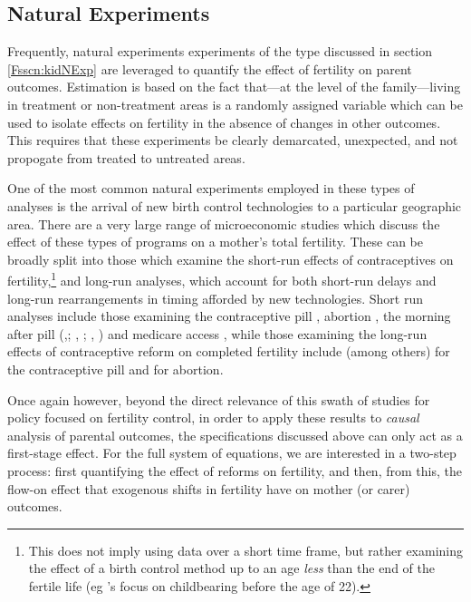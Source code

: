 \documentclass{article}
\begin{document}
\begin{spacing}{1.4}
\subsection{Natural Experiments}
\label{Fsscn:motherNExp}
Frequently, natural experiments experiments of the type discussed in section 
\ref{Fsscn:kidNExp} are leveraged to quantify the effect of fertility on 
parent outcomes.  Estimation is based on the fact that---at the level of the
family---living in treatment or non-treatment areas is a randomly assigned
variable which can be used to isolate effects on fertility in the absence of 
changes in other outcomes.  This requires that these experiments be clearly 
demarcated, unexpected, and not propogate from treated to untreated areas.

One of the most common natural experiments employed in these types of analyses 
is the arrival of new birth control technologies to a particular geographic 
area.  There are a very large range of microeconomic studies which discuss 
the effect of these types of programs on a mother's total fertility.  These can
be broadly split into those which examine the short-run effects of 
contraceptives on fertility,\footnote{This does not imply using data over a 
short time frame, but rather examining the effect of a birth control method up 
to an age \emph{less} than the end of the fertile life (eg \citet{Bailey2006}'s
focus on childbearing before the age of 22).} and long-run analyses, which 
account for both short-run delays and long-run rearrangements in timing 
afforded by new technologies.  Short run analyses include those examining the 
contraceptive pill \citep{Bailey2006,Bailey2009,Christensen2012}, abortion
\citep{Guldi2008,Levineetal1999}, the morning after pill 
(\citeauthor{Grossetal2014},\citeyear{Grossetal2014}; \citeauthor{Durrance2013}, 
\citeyear{Durrance2013}; \citeauthor{BentancorClarke2014},
\citeyear{BentancorClarke2014}) and medicare access \citep{KearnerLevine2009}, 
while those examining the long-run effects of contraceptive reform on completed 
fertility include (among others) \citet{Bailey2011,Bailey2013,Bailey2012} for 
the contraceptive pill and \citet{AngristEvans1996,OltmansHungerman2012} for 
abortion.

Once again however, beyond the direct relevance of this swath of studies for
policy focused on fertility control, in order to apply these results to
\emph{causal} analysis of parental outcomes, the specifications discussed above 
can only act as a first-stage effect.  For the full system of equations, we
are interested in a two-step process: first quantifying the effect of reforms
on fertility, and then, from this, the flow-on effect that exogenous shifts in
fertility have on mother (or carer) outcomes.


\end{spacing}
\end{document}
